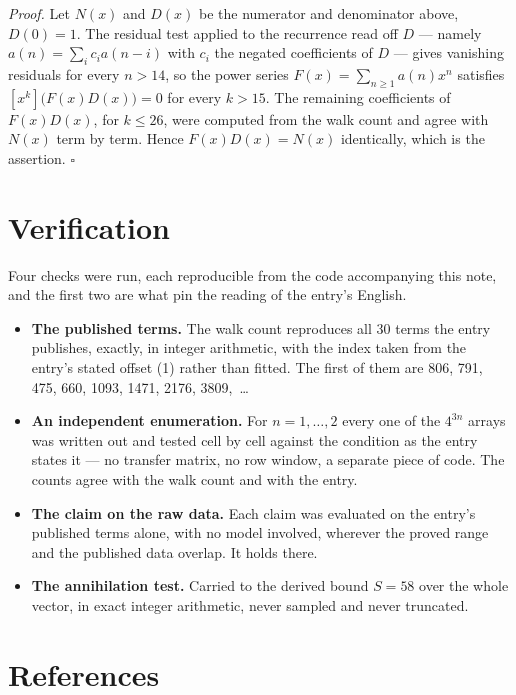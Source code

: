 \documentclass[11pt]{article}
\theoremstyle{definition}
\begin{document}
{\itshape Proof.} Let $N(x)$ and $D(x)$ be the numerator and denominator above, $D(0)=1$. The residual test applied to the recurrence read off $D$ --- namely $a(n) = \sum_i c_i a(n-i)$ with $c_i$ the negated coefficients of $D$ --- gives vanishing residuals for every $n > 14$, so the power series $F(x)=\sum_{n\ge 1}a(n)x^n$ satisfies $[x^k]\bigl(F(x)D(x)\bigr) = 0$ for every $k > 15$. The remaining coefficients of $F(x)D(x)$, for $k \le 26$, were computed from the walk count and agree with $N(x)$ term by term. Hence $F(x)D(x) = N(x)$ identically, which is the assertion. $\square$

\section{Verification}

Four checks were run, each reproducible from the code accompanying this note, and the first two are what pin the reading of the entry's English.

\begin{itemize}

\item {\bfseries The published terms.} The walk count reproduces all 30 terms the entry publishes, exactly, in integer arithmetic, with the index taken from the entry's stated offset (1) rather than fitted. The first of them are 806, 791, 475, 660, 1093, 1471, 2176, 3809,~\dots

\item {\bfseries An independent enumeration.} For $n = 1,\dots,2$ every one of the $4^{3n}$ arrays was written out and tested cell by cell against the condition as the entry states it --- no transfer matrix, no row window, a separate piece of code. The counts agree with the walk count and with the entry.

\item {\bfseries The claim on the raw data.} Each claim was evaluated on the entry's published terms alone, with no model involved, wherever the proved range and the published data overlap. It holds there.

\item {\bfseries The annihilation test.} Carried to the derived bound $S = 58$ over the whole vector, in exact integer arithmetic, never sampled and never truncated.

\end{itemize}

\section{References}
\end{document}
